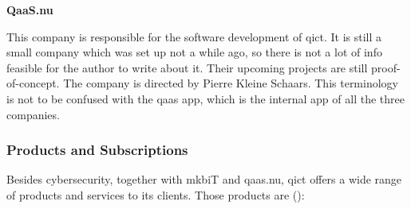 \begin{multicols}{2}
      \textbf{QaaS.nu}

      This company is responsible for the software development of \acrshort{qict}. It is still a small company which was set up not a while ago,
      so there is not a lot of info feasible for the author to write about it. Their upcoming projects are still proof-of-concept. The company
      is directed by Pierre Kleine Schaars. This terminology is not to be confused with the \acrshort{qaas} app, which is the internal app of
      all the three companies.

      \subsubsection{Products and Subscriptions}

      Besides cybersecurity, together with \acrshort{mkb}iT and \acrshort{qaas}.nu, \acrshort{qict} offers a wide range of products and
      services to its clients. Those products are (\textit{\cite{qictProducts}}):


\end{multicols}
